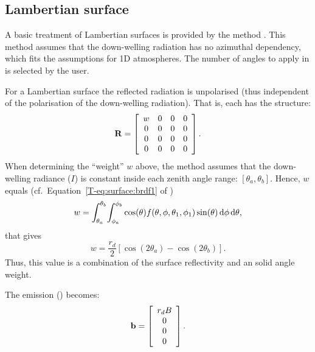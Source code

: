 \subsection{Lambertian surface}
A basic treatment of Lambertian surfaces is provided by the method
. This method assumes that the down-welling
radiation has no azimuthal dependency, which fits the assumptions for 1D
atmospheres. The number of angles to apply in  is
selected by the user. 

For a Lambertian surface the reflected radiation is unpolarised (thus
independent of the polarisation of the down-welling radiation). That is,
each  has the structure:
\begin{equation}
  \mathbf{R} =
     \left[\begin{array}{cccc}
       w&0&0&0\\
       0&0&0&0\\
       0&0&0&0\\
       0&0&0&0\\
     \end{array}
     \right].
\end{equation}
When determining the ``weight'' $w$ above, the method assumes that the
down-welling radiance ($I$) is constant inside each zenith angle range:
$[\theta_a,\theta_b]$. Hence, $w$ equals (cf.\
Equation~\ref{T-eq:surface:brdf1} of \theory)
\begin{equation}
  \label{eq:surface:brdf2}
  w = \int_{\theta_a}^{\theta_b} \! \int_{\phi_a}^{\phi_b} 
  \cos(\theta) f(\theta,\phi,\theta_1,\phi_1)
  \sin(\theta) \, \mathrm{d}\phi \, \mathrm{d}\theta,
\end{equation}
that gives
\begin{equation}
  w = \frac{r_d}{2}\left[\cos(2\theta_a)-\cos(2\theta_b)\right].
\end{equation}
Thus, this value is a combination of the surface reflectivity and an solid
angle weight.

The emission () becomes:
\begin{equation}
  \label{eq:surface:blambertian} 
  {\bf b} =  \left[\begin{array}{c} r_dB \\ 0 \\0\\0 \end{array}\right].
\end{equation}



